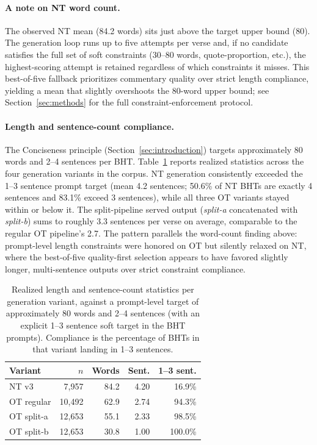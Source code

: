 \paragraph{A note on NT word count.} The observed NT mean (84.2 words) sits just above the target upper bound (80). The generation loop runs up to five attempts per verse and, if no candidate satisfies the full set of soft constraints (30--80 words, quote-proportion, etc.), the highest-scoring attempt is retained regardless of which constraints it misses. This best-of-five fallback prioritizes commentary quality over strict length compliance, yielding a mean that slightly overshoots the 80-word upper bound; see Section~\ref{sec:methods} for the full constraint-enforcement protocol.

\paragraph{Length and sentence-count compliance.} The Conciseness principle (Section~\ref{sec:introduction}) targets approximately 80 words and 2--4 sentences per BHT. Table~\ref{tab:length-compliance} reports realized statistics across the four generation variants in the corpus. NT generation consistently exceeded the 1--3 sentence prompt target (mean 4.2 sentences; 50.6\% of NT BHTs are exactly 4 sentences and 83.1\% exceed 3 sentences), while all three OT variants stayed within or below it. The split-pipeline served output (\emph{split-a} concatenated with \emph{split-b}) sums to roughly 3.3 sentences per verse on average, comparable to the regular OT pipeline's 2.7. The pattern parallels the word-count finding above: prompt-level length constraints were honored on OT but silently relaxed on NT, where the best-of-five quality-first selection appears to have favored slightly longer, multi-sentence outputs over strict constraint compliance.

\begin{table}[htbp]
\centering
\small
\setlength{\tabcolsep}{4pt}
\caption{Realized length and sentence-count statistics per generation variant, against a prompt-level target of approximately 80 words and 2--4 sentences (with an explicit 1--3 sentence soft target in the BHT prompts). Compliance is the percentage of BHTs in that variant landing in 1--3 sentences.}
\label{tab:length-compliance}
\begin{tabular}{@{}lrrrr@{}}
\toprule
\textbf{Variant} & $n$ & \textbf{Words} & \textbf{Sent.} & \textbf{1--3 sent.} \\
\midrule
NT v3 & 7{,}957 & 84.2 & 4.20 & 16.9\% \\
OT regular & 10{,}492 & 62.9 & 2.74 & 94.3\% \\
OT split-a & 12{,}653 & 55.1 & 2.33 & 98.5\% \\
OT split-b & 12{,}653 & 30.8 & 1.00 & 100.0\% \\
\bottomrule
\end{tabular}
\end{table}

